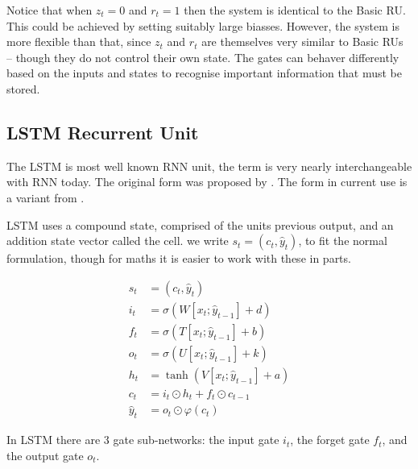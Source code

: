 \documentclass[12pt,parskip]{komatufte}
\begin{document}
Notice that when $z_t=0$ and $r_t=1$ then the system is identical to the Basic RU.
This could be achieved by setting suitably large biasses.
However, the system is more flexible than that, 
since $z_t$ and $r_t$ are themselves very similar to Basic RUs -- though they do not control their own state.
The gates can behaver differently based on the inputs and states to recognise important information that must be stored.



\subsection{LSTM Recurrent Unit}\label{sec:ltsm}
The LSTM is most well known RNN unit, the term is very nearly interchangeable with RNN today.
The original form was proposed by .
The form in current use is a variant from .

LSTM uses a compound state, comprised of the units previous output, and an addition state vector called the cell.
we write $s_t = (c_t, \hat{y}_t)$,
to fit the normal formulation,
though for maths it is easier to work with these in parts.


\begin{align}
s_t &= (c_t, \hat{y}_t)\\
%
i_t &= \sigma \left( W[x_t; \hat{y}_{t-1}] + d \right) \\
f_t &= \sigma \left( T[x_t; \hat{y}_{t-1}] + b \right) \\
o_t &= \sigma \left( U[x_t; \hat{y}_{t-1}] + k \right) \\
%
h_t &= \tanh \left( V[x_t; \hat{y}_{t-1}] + a \right) \\
c_t &=  i_t\odot h_{t} + f_t \odot c_{t-1} \\
\hat{y}_t &= o_t \odot \varphi(c_t)
\end{align}



In LSTM there are 3 gate sub-networks:
the input gate $i_t$, the forget gate $f_t$, and the output gate $o_t$.
\end{document}

